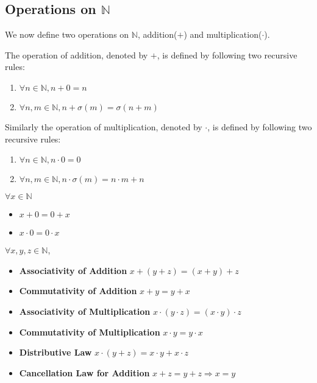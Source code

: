 \documentclass{report}
\begin{document}
		\subsection{Operations on $\mathbb{N}$}
		We now define two operations on $\mathbb{N}$, addition($+$) and multiplication($\cdot$).
		
		\begin{defn} \label{def_add_mult_N}
			The operation of addition, denoted by $+$, is defined by following two recursive rules:
			\begin{enumerate}
				\item $\forall n \in \mathbb{N}, n+0=n$
				\item $\forall n,m \in \mathbb{N}, n+\sigma(m)=\sigma(n+m)$
			\end{enumerate}
			Similarly the operation of multiplication, denoted by $\cdot$, is defined by following two recursive rules:
			\begin{enumerate}
				\item $\forall n \in \mathbb{N}, n \cdot 0=0$
				\item $\forall n,m \in \mathbb{N}, n \cdot \sigma(m)=n \cdot m+n$
			\end{enumerate}
		\end{defn}
		
		\begin{lemma}[Operations on $0$] \label{thm_n_op_on_0}
			$\forall x \in \mathbb{N}$
			\begin{itemize}
				\item $x+0=0+x$
				\item $x \cdot 0=0 \cdot x$
			\end{itemize}
		\end{lemma}
		
		\begin{prop} \label{thm_property_operation_N}
			$\forall x,y,z \in \mathbb{N}$,
			\begin{itemize}
				\item \textbf{Associativity of Addition} $x+(y+z)=(x+y)+z$
				\item \textbf{Commutativity of Addition} $x+y=y+x$
				\item \textbf{Associativity of Multiplication} $x \cdot (y \cdot z)=(x \cdot y) \cdot z$
				\item \textbf{Commutativity of Multiplication} $x \cdot y=y \cdot x$
				\item \textbf{Distributive Law} $x \cdot (y+z)=x \cdot y+x \cdot z$
				\item \textbf{Cancellation Law for Addition} $x+z=y+z \Rightarrow x=y$
			\end{itemize}
		\end{prop}
		
\end{document}
